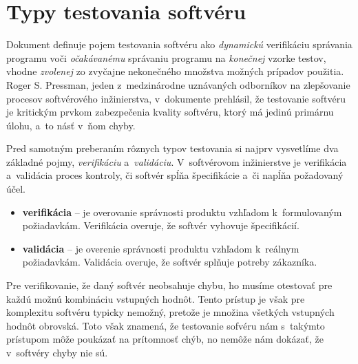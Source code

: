 \section{Typy testovania softvéru} 
\label{sekcia:typy_testovania}
Dokument \cite{Swebok} definuje pojem testovania softvéru ako 
\emph{dynamickú} verifikáciu správania programu voči \emph{očakávanému} 
správaniu programu na \emph{konečnej} vzorke testov, vhodne \emph{zvolenej} 
zo zvyčajne nekonečného množstva možných prípadov použitia.
Roger S. Pressman, jeden z~medzinárodne uznávaných odborníkov na 
zlepšovanie procesov softvérového inžinierstva, v~dokumente 
\cite{Pressman} prehlásil, že testovanie softvéru je kritickým prvkom 
zabezpečenia kvality softvéru, ktorý má jedinú primárnu úlohu, 
a~to násť v~ňom chyby.  

Pred samotným preberaním rôznych typov testovania si najprv vysvetlíme
dva základné pojmy, \emph{verifikáciu} a~\emph{validáciu}. 
V~softvérovom inžinierstve je verifikácia a~validácia proces kontroly, či
softvér spĺňa špecifikácie a~či napĺňa požadovaný účel.
\begin{itemize}
\item \textbf{verifikácia} -- je overovanie správnosti produktu vzhľadom
k~formulovaným požiadavkám. Verifikácia overuje, že softvér vyhovuje 
špecifikácií.
\item \textbf{validácia} -- je overenie správnosti produktu vzhľadom
k~reálnym požiadavkám. Validácia overuje, že softvér splňuje potreby
zákazníka.
\end{itemize}

Pre verifikovanie, že daný softvér neobsahuje chybu, ho musíme otestovať
pre každú možnú kombináciu vstupných hodnôt. Tento prístup je však pre 
komplexitu softvéru typicky nemožný, pretože je množina všetkých vstupných
hodnôt obrovská. Toto však znamená, že testovanie sofvéru nám s~takýmto 
prístupom môže poukázať na prítomnosť chýb, no nemôže nám dokázať, 
že v~softvéry chyby nie sú.

